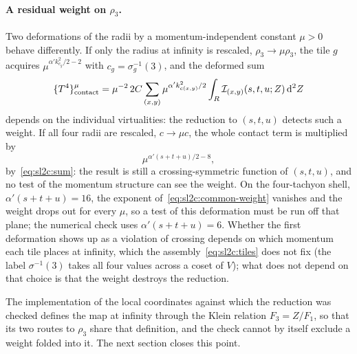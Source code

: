 \paragraph{A residual weight on $\rho_3$.}
Two deformations of the radii by a momentum-independent constant $\mu > 0$ behave differently.
If only the radius at infinity is rescaled, $\rho_3 \to \mu \rho_3$, the tile $g$ acquires $\mu^{\alpha' k_{c_g}^2 / 2 - 2}$ with $c_g = \sigma_g^{-1}(3)$, and the deformed sum
\begin{equation}
  \{ T^4 \}^{\mu}_{\rm contact}
    = \mu^{-2} \, 2 C \sum_{(x, y)} \mu^{\alpha' k_{c(x, y)}^2 / 2} \int_R \mathcal I_{(x, y)}(s, t, u; Z) \, \mathrm{d}^2 Z
\end{equation}
depends on the individual virtualities: the reduction to $(s, t, u)$ detects such a weight.
If all four radii are rescaled, $c \to \mu c$, the whole contact term is multiplied by
\begin{equation}
  \label{eq:sl2c:common-weight}
  \mu^{\alpha' (s + t + u) / 2 - 8},
\end{equation}
by~\eqref{eq:sl2c:sum}: the result is still a crossing-symmetric function of $(s, t, u)$, and no test of the momentum structure can see the weight.
On the four-tachyon shell, $\alpha' (s + t + u) = 16$, the exponent of~\eqref{eq:sl2c:common-weight} vanishes and the weight drops out for every $\mu$, so a test of this deformation must be run off that plane; the numerical check uses $\alpha' (s + t + u) = 6$.
Whether the first deformation shows up as a violation of crossing depends on which momentum each tile places at infinity, which the assembly~\eqref{eq:sl2c:tiles} does not fix (the label $\sigma^{-1}(3)$ takes all four values across a coset of $V$); what does not depend on that choice is that the weight destroys the reduction.

The implementation of the local coordinates against which the reduction was checked defines the map at infinity through the Klein relation $F_3 = Z / F_1$, so that its two routes to $\rho_3$ share that definition, and the check cannot by itself exclude a weight folded into it.
The next section closes this point.

